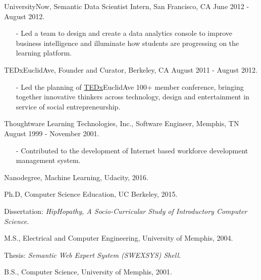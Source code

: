 \documentclass[11pt,article,oneside]{memoir}
\begin{document}
\ind UniversityNow, Semantic Data Scientist Intern, San Francisco, CA June 2012 - August 2012.
\begin{itemize}[noitemsep,nolistsep]
\item[-]Led a team to design and create a data analytics console to improve business intelligence and illuminate how students are progressing on the learning platform.
\end{itemize} 

\ind TEDxEuclidAve, Founder and Curator, Berkeley, CA August 2011 - August 2012.
\begin{itemize}[noitemsep,nolistsep]
\item[-]Led the planning of \href{http://www.ted.com/tedx/events/3790}{TEDx}EuclidAve 100+ member conference, bringing together innovative thinkers across technology, design and entertainment in service of social entrepreneurship.
\end{itemize} 

\ind Thoughtware Learning Technologies, Inc., Software Engineer, Memphis, TN August 1999 - November 2001.
\begin{itemize}[noitemsep,nolistsep]
\item[-]Contributed to the development of Internet based workforce development management system.
\end{itemize} 

\bigskip 



\ind Nanodegree, Machine Learning, Udacity, 2016.\vspace{0.05in}

\ind Ph.D, Computer Science Education, UC Berkeley, 2015.

\ind \hspace{0.35in} \footnotesize Dissertation: \emph{HipHopathy, A Socio-Curricular Study of Introductory Computer Science.} \normalsize \vspace{0.05in}

\ind M.S., Electrical and Computer Engineering, University of Memphis, 2004. 

\ind \hspace{0.35in} \footnotesize Thesis: \emph{Semantic Web Expert System (SWEXSYS) Shell.} \normalsize \vspace{0.01in}

\ind B.S., Computer Science, University of Memphis, 2001.
\bigskip 


\medskip
\end{document}
